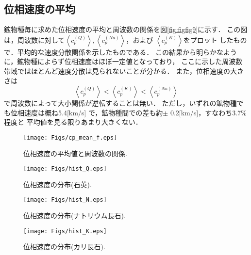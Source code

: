 \subsection{位相速度の平均}
鉱物種毎に求めた位相速度の平均と周波数の関係を図\ref{fig:figfig9}に示す．
この図は，周波数に対して$\left< c_p^{(Q)}\right>, 
\left< c_p^{(Na)}\right>$，および $\left< c_p^{(K)}\right>$をプロット
したもので．平均的な速度分散関係を示したものである．
この結果から明らかなように，鉱物種によらず位相速度はほぼ一定値となっており，
ここに示した周波数帯域ではほとんど速度分散は見られないことが分かる．
また，位相速度の大きさは
\begin{equation}
	\left< c_p^{(Q)} \right> 
	< 
	\left< c_p^{(K)} \right> 
	< 
	\left< c_p^{(Na)}\right>
	\label{eqn:}
\end{equation}
で周波数によって大小関係が逆転することは無い．
ただし，いずれの鉱物種でも位相速度は概ね5.4[km/s]
で，鉱物種間での差も約$\pm$ 0.2[km/s]，すなわち3.7$\%$程度と
平均値を見る限りあまり大きくない．
\begin{figure}
\begin{center}
	\texttt{[image: Figs/cp\_mean\_f.eps]}
	\caption{位相速度の平均値と周波数の関係.}
	\label{fig:fig9}
\end{center}
	\vspace{-10mm}
\end{figure}
\begin{figure}
\begin{center}
	\texttt{[image: Figs/hist\_Q.eps]}
	\caption{位相速度の分布(石英).}
	\label{fig:fig10}
\end{center}
	\vspace{-10mm}
\end{figure}
\begin{figure}
\begin{center}
	\texttt{[image: Figs/hist\_N.eps]}
	\caption{位相速度の分布(ナトリウム長石).}
	\label{fig:fig11}
\end{center}
	\vspace{-10mm}
\end{figure}
\begin{figure}
\begin{center}
	\texttt{[image: Figs/hist\_K.eps]}
	\caption{位相速度の分布(カリ長石).}
	\label{fig:fig12}
\end{center}
	\vspace{-10mm}
\end{figure}
